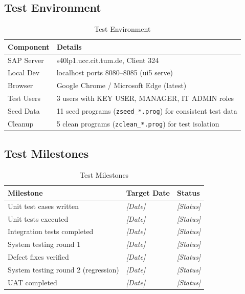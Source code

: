 \documentclass[12pt,a4paper]{report}
\newcommand{\placeholder}[1]{\textcolor{placeholderblue}{\textit{[#1]}}}
\begin{document}
\subsection{Test Environment}

\begin{table}[H]
\centering\small
\begin{tabularx}{\textwidth}{|l|X|}
  \hline
  \rowcolor{tableheadpeach}
  \textbf{Component} & \textbf{Details} \\ \hline
  SAP Server  & s40lp1.ucc.cit.tum.de, Client 324 \\ \hline
  Local Dev   & localhost ports 8080--8085 (ui5 serve) \\ \hline
  Browser     & Google Chrome / Microsoft Edge (latest) \\ \hline
  Test Users  & 3 users with KEY USER, MANAGER, IT ADMIN roles \\ \hline
  Seed Data   & 11 seed programs (\texttt{zseed\_*.prog}) for consistent test data \\ \hline
  Cleanup     & 5 clean programs (\texttt{zclean\_*.prog}) for test isolation \\ \hline
\end{tabularx}
\caption{Test Environment}
\label{tab:test-env}
\end{table}

\subsection{Test Milestones}

\begin{table}[H]
\centering\small
\begin{tabularx}{\textwidth}{|X|l|l|}
  \hline
  \rowcolor{tableheadpeach}
  \textbf{Milestone} & \textbf{Target Date} & \textbf{Status} \\ \hline
  Unit test cases written               & \placeholder{Date} & \placeholder{Status} \\ \hline
  Unit tests executed                   & \placeholder{Date} & \placeholder{Status} \\ \hline
  Integration tests completed           & \placeholder{Date} & \placeholder{Status} \\ \hline
  System testing round 1                & \placeholder{Date} & \placeholder{Status} \\ \hline
  Defect fixes verified                 & \placeholder{Date} & \placeholder{Status} \\ \hline
  System testing round 2 (regression)   & \placeholder{Date} & \placeholder{Status} \\ \hline
  UAT completed                         & \placeholder{Date} & \placeholder{Status} \\ \hline
\end{tabularx}
\caption{Test Milestones}
\label{tab:test-milestones}
\end{table}
\end{document}
